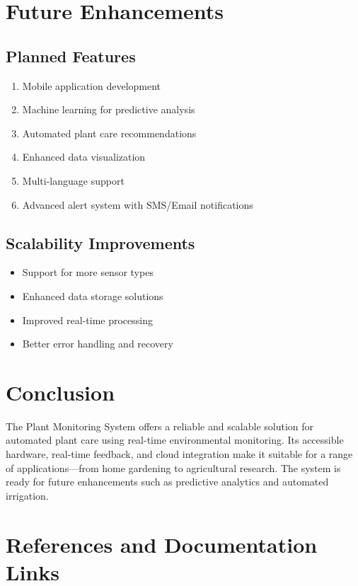 \documentclass[12pt,a4paper]{article}
\begin{document}
\section{Future Enhancements}

\subsection{Planned Features}
\begin{enumerate}[leftmargin=*]
    \item Mobile application development
    \item Machine learning for predictive analysis
    \item Automated plant care recommendations
    \item Enhanced data visualization
    \item Multi-language support
    \item Advanced alert system with SMS/Email notifications
\end{enumerate}

\subsection{Scalability Improvements}
\begin{itemize}[leftmargin=*]
    \item Support for more sensor types
    \item Enhanced data storage solutions
    \item Improved real-time processing
    \item Better error handling and recovery
\end{itemize}

\section{Conclusion}

The Plant Monitoring System offers a reliable and scalable solution for automated plant care using real-time environmental monitoring. Its accessible hardware, real-time feedback, and cloud integration make it suitable for a range of applications—from home gardening to agricultural research. The system is ready for future enhancements such as predictive analytics and automated irrigation.

\newpage
\section*{References and Documentation Links}
\end{document}

